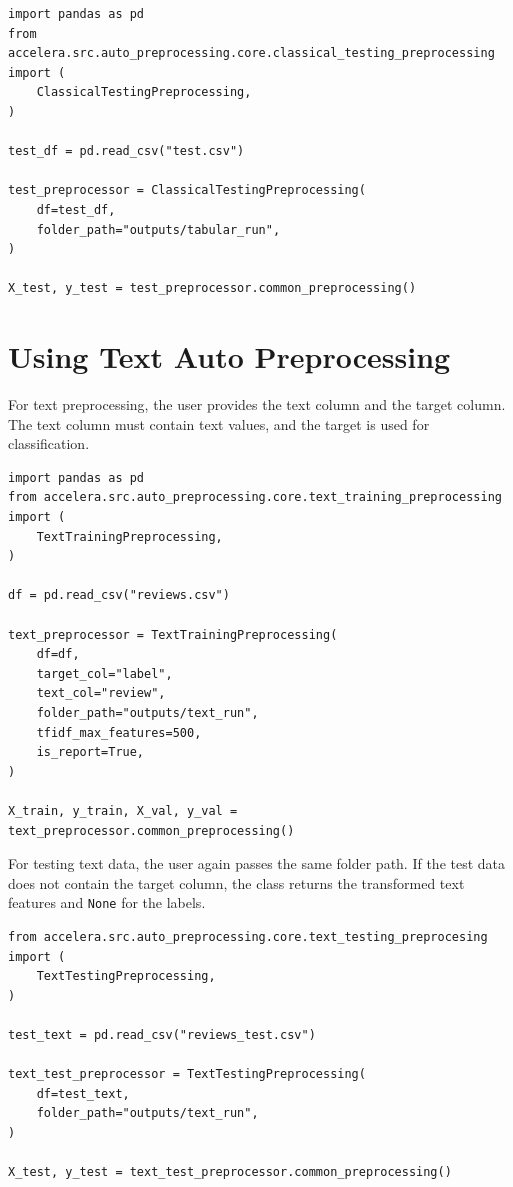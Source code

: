 \documentclass[12pt,a4paper]{report}
\begin{document}
\begin{lstlisting}[style=code,caption={Calling tabular testing preprocessing}]
import pandas as pd
from accelera.src.auto_preprocessing.core.classical_testing_preprocessing import (
    ClassicalTestingPreprocessing,
)

test_df = pd.read_csv("test.csv")

test_preprocessor = ClassicalTestingPreprocessing(
    df=test_df,
    folder_path="outputs/tabular_run",
)

X_test, y_test = test_preprocessor.common_preprocessing()
\end{lstlisting}

\section{Using Text Auto Preprocessing}
For text preprocessing, the user provides the text column and the target
column. The text column must contain text values, and the target is used for
classification.

\begin{lstlisting}[style=code,caption={Calling text training preprocessing}]
import pandas as pd
from accelera.src.auto_preprocessing.core.text_training_preprocessing import (
    TextTrainingPreprocessing,
)

df = pd.read_csv("reviews.csv")

text_preprocessor = TextTrainingPreprocessing(
    df=df,
    target_col="label",
    text_col="review",
    folder_path="outputs/text_run",
    tfidf_max_features=500,
    is_report=True,
)

X_train, y_train, X_val, y_val = text_preprocessor.common_preprocessing()
\end{lstlisting}

For testing text data, the user again passes the same folder path. If the test
data does not contain the target column, the class returns the transformed text
features and \texttt{None} for the labels.

\begin{lstlisting}[style=code,caption={Calling text testing preprocessing}]
from accelera.src.auto_preprocessing.core.text_testing_preprocesing import (
    TextTestingPreprocessing,
)

test_text = pd.read_csv("reviews_test.csv")

text_test_preprocessor = TextTestingPreprocessing(
    df=test_text,
    folder_path="outputs/text_run",
)

X_test, y_test = text_test_preprocessor.common_preprocessing()
\end{lstlisting}
\end{document}
